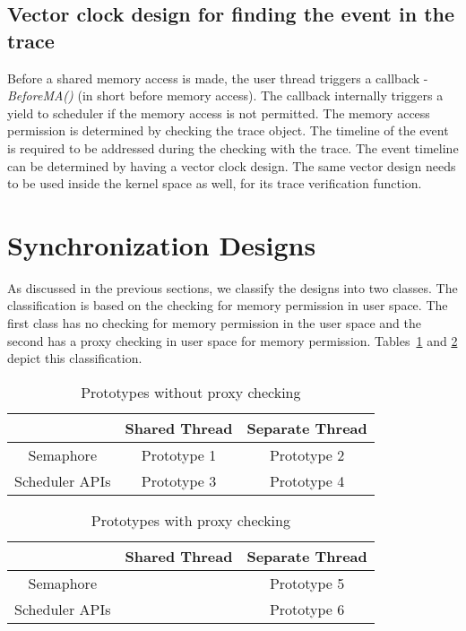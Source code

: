 \subsection{Vector clock design for finding the event in the trace}

Before a shared memory access is made, the user thread triggers a callback - \emph{BeforeMA()} (in short before memory access). 
The callback internally triggers a yield to scheduler if the memory access is not permitted. 
The memory access permission is determined by checking the trace object. 
The timeline of the event is required to be addressed during the checking with the trace. 
The event timeline can be determined by having a vector clock design. 
The same vector design needs to be used inside the kernel space as well, for its trace verification function.



\section{Synchronization Designs \label{sync_des}}

As discussed in the previous sections, we classify the designs into two classes. 
The classification is based on the checking for memory permission in user space. 
The first class has no checking for memory permission in the user space and the second has a proxy checking in user space for memory permission. 
Tables~\ref{protos_without_proxy} and \ref{protos_with_proxy} depict this classification.

\begin{table}[h]
\begin{center}
 \begin{tabular}{|c c c|} 
 \hline
 & Shared Thread & Separate Thread\\ %
 \hline
Semaphore & Prototype 1 & Prototype 2\\
Scheduler APIs & Prototype 3 & Prototype 4\\
\hline
\end{tabular}
\end{center}
\caption{Prototypes without proxy checking}
\label{protos_without_proxy}
\end{table}

\begin{table}[h]
\begin{center}
 \begin{tabular}{|c c c|} 
 \hline
 & Shared Thread & Separate Thread\\ %
 \hline
Semaphore &  & Prototype 5\\
Scheduler APIs &  & Prototype 6\\
\hline
\end{tabular}
\end{center}
\caption{Prototypes with proxy checking}
\label{protos_with_proxy}
\end{table}

